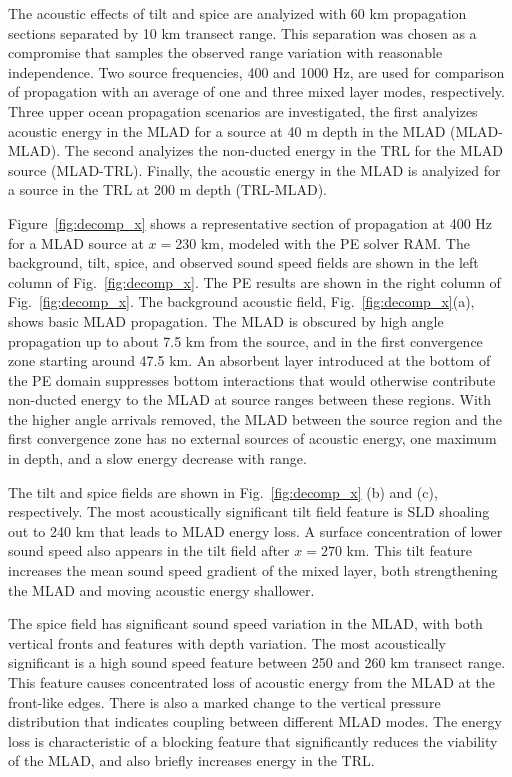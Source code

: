 \documentclass[preprint,NumberedRefs]{JASA}
\begin{document}
The acoustic effects of tilt and spice are analyized with 60 km propagation sections separated by 10 km transect range. This separation was chosen as a compromise that samples the observed range variation with reasonable independence. Two source frequencies, 400 and 1000 Hz, are used for comparison of propagation with an average of one and three mixed layer modes, respectively. Three upper ocean propagation scenarios are investigated, the first analyizes acoustic energy in the MLAD for a source at 40 m depth in the MLAD (MLAD-MLAD). The second analyizes the non-ducted energy in the TRL for the MLAD source (MLAD-TRL). Finally, the acoustic energy in the MLAD is analyized for a source in the TRL at 200 m depth (TRL-MLAD).

Figure~\ref{fig:decomp_x} shows a representative section of propagation at 400 Hz for a MLAD source at $x=$230 km, modeled with the PE solver RAM\citep{collins93}. The background, tilt, spice, and observed sound speed fields are shown in the left column of Fig.~\ref{fig:decomp_x}. The PE results are shown in the right column of Fig.~\ref{fig:decomp_x}. The background acoustic field, Fig.~\ref{fig:decomp_x}(a), shows basic MLAD propagation. The MLAD is obscured by high angle propagation up to about 7.5 km from the source, and in the first convergence zone starting around 47.5 km. An absorbent layer introduced at the bottom of the PE domain suppresses bottom interactions that would otherwise contribute non-ducted energy to the MLAD at source ranges between these regions. With the higher angle arrivals removed, the MLAD between the source region and the first convergence zone has no external sources of acoustic energy, one maximum in depth, and a slow energy decrease with range.

The tilt and spice fields are shown in Fig.~\ref{fig:decomp_x} (b) and (c), respectively. The most acoustically significant tilt field feature is SLD shoaling out to 240 km that leads to MLAD energy loss. A surface concentration of lower sound speed also appears in the tilt field after $x=270$ km. This tilt feature increases the mean sound speed gradient of the mixed layer, both strengthening the MLAD and moving acoustic energy shallower.

The spice field has significant sound speed variation in the MLAD, with both vertical fronts and features with depth variation. The most acoustically significant is a high sound speed feature between 250 and 260 km transect range. This feature causes concentrated loss of acoustic energy from the MLAD at the front-like edges. There is also a marked change to the vertical pressure distribution that indicates coupling between different MLAD modes. The energy loss is characteristic of a blocking feature that significantly reduces the viability of the MLAD, and also briefly increases energy in the TRL.
\end{document}
